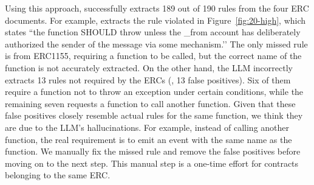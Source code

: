 
\fi



Using this approach, \Tool{} successfully extracts 
189 out of  190 rules from the four ERC documents. 
For example, 
\Tool{} extracts the rule violated 
in Figure~\ref{fig:20-high}, 
which states ``the function SHOULD throw unless the \_from account has deliberately authorized the sender of the message via some mechanism.’’
%
The only missed rule is from ERC1155, requiring a function to be called, 
but the correct name of the function is not accurately extracted. 
%
On the other hand, the LLM incorrectly extracts 13
rules not required by the ERCs (\ie, 13 false positives). 
Six of them require a function not to throw an exception under certain conditions, 
while the remaining seven
requests a function to call another function. 
Given that these false positives closely resemble actual rules 
for the same function, we think they are due to the 
LLM’s hallucinations. For example, instead of calling another function, the real requirement is to emit an event with the same name as the function. 
We manually fix the missed rule
and remove the false positives before 
moving on to the next step.
This manual step is a one-time effort for contracts belonging to the same ERC. 


\fi


